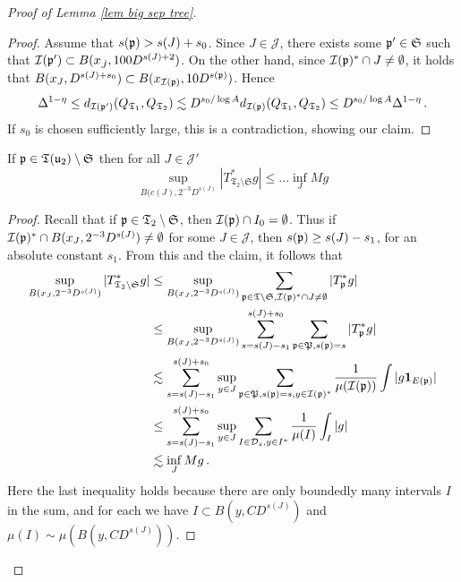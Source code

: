 \begin{proof}[Proof of Lemma \ref{lem big sep tree}]
    \begin{proof}
        Assume that $s(\mathfrak p) > s(J) + s_0$. Since $J \in \mathcal{J}$, there exists some $\mathfrak p' \in \mathfrak{S}$ such that $\mathcal{I}(\mathfrak p') \subset B(x_{\hat J}, 100 D^{s(J) + 2})$. On the other hand, since $\mathcal{I}(\mathfrak p)^* \cap J \neq \emptyset$, it holds that $B(x_J, D^{s(J) + s_0}) \subset B(x_{\mathcal{I}(\mathfrak p)}, 10 D^{s(\mathfrak p)})$. Hence
        \begin{align*}
            \Delta^{1 - \eta} \leq d_{\mathcal{I}(\mathfrak p')} ( Q_{\mathfrak{T}_1}, Q_{\mathfrak{T}_2}) \lesssim D^{s_0/\log A} d_{\mathcal{I}(\mathfrak p)} ( Q_{\mathfrak{T}_1}, Q_{\mathfrak{T}_2}) \leq D^{s_0/\log A} \Delta^{1 - \eta}\,.
        \end{align*}
        If $s_0$ is chosen sufficiently large, this is a contradiction, showing our claim.
    \end{proof}

    \begin{lemma}
        \label{lem sep tree aux 3}
        If $\mathfrak p \in \mathfrak T(\mathfrak u_2) \setminus \mathfrak{S}$ then for all $J \in \mathcal{J}'$
        $$
            \sup_{B(c(J), 2^{-3} D^{s(J)}} |T_{\mathfrak{T}_2 \setminus\mathfrak{S}}^* g| \le ... \inf_J Mg
        $$
    \end{lemma}

    \begin{proof}
        Recall that if $\mathfrak p\in \mathfrak{T}_2 \setminus \mathfrak{S}$, then $\mathcal{I}(\mathfrak p) \cap I_0 = \emptyset$. Thus if $\mathcal{I}(\mathfrak p)^* \cap B(x_J, 2^{-3} D^{s(J)}) \neq \emptyset$ for some $J \in \mathcal{J}$, then $s(\mathfrak p) \geq s(J) - s_1$, for an absolute constant $s_1$. From this and the claim, it follows that
        \begin{align*}
            \sup_{B(x_J, 2^{-3}D^{s(J)})} |T_{\mathfrak{T}_2 \setminus\mathfrak{S}}^* g|
            &\leq \sup_{B(x_J, 2^{-3}D^{s(J)})}\sum_{\mathfrak p \in \mathfrak{T}\setminus \mathfrak{S}, \mathcal{I}(\mathfrak p)^* \cap J \neq \emptyset} |T_{\mathfrak p}^*g|\\
            &\leq \sup_{B(x_J, 2^{-3} D^{s(J)})} \sum_{s = s(J)-s_1}^{s(J) + s_0} \sum_{\mathfrak p \in \mathfrak P, s(\mathfrak p) = s} |T_{\mathfrak p}^* g|\\
            &\lesssim \sum_{s = s(J)-s_1}^{s(J) + s_0} \sup_{y \in J}  \sum_{\mathfrak p \in \mathfrak P, s(\mathfrak p) = s, y \in \mathcal{I}(\mathfrak p)^*} \frac{1}{\mu(\mathcal{I}(\mathfrak p))} \int |g\mathbf{1}_{E(\mathfrak p)}| \\
            &\leq \sum_{s = s(J)-s_1}^{s(J) + s_0} \sup_{y \in J}  \sum_{I \in \mathcal{D}_s, y \in I^*} \frac{1}{\mu(I)} \int_I |g| \\
            &\lesssim \inf_{J} Mg\,.
        \end{align*}
        Here the last inequality holds because there are only boundedly many intervals $I$ in the sum, and for each we have $I \subset B(y, CD^{s(J)})$ and $\mu(I) \sim \mu(B(y, CD^{s(J)}))$.
    \end{proof}



\end{proof}
